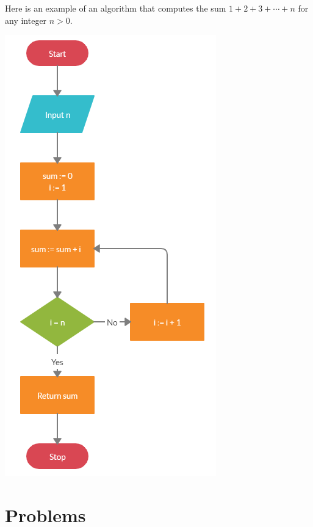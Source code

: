 \documentclass{ximera}
\begin{document}
Here is an example of an algorithm that computes the sum $1+2+3+\cdots+n$ for any integer $n>0$.

\begin{center}
	\includegraphics{gausssum2.png}
\end{center}

\section{Problems}
\end{document}
